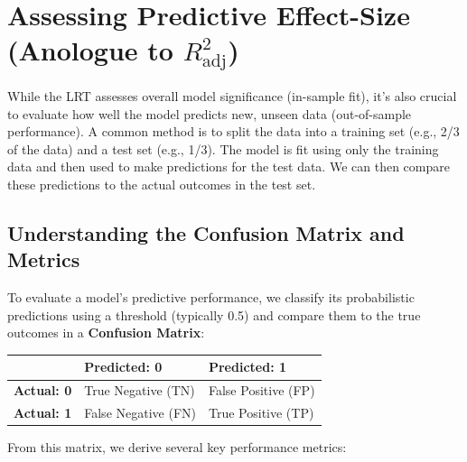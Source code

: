 \documentclass[
  letterpaper,
  DIV=11,
  numbers=noendperiod]{scrreprt}
\begin{document}
\section{\texorpdfstring{Assessing Predictive Effect-Size (Anologue to
\(R^2_\mathrm{adj}\))}{Assessing Predictive Effect-Size (Anologue to R\^{}2\_\textbackslash mathrm\{adj\})}}\label{assessing-predictive-effect-size-anologue-to-r2_mathrmadj}

While the LRT assesses overall model significance (in-sample fit), it's
also crucial to evaluate how well the model predicts new, unseen data
(out-of-sample performance). A common method is to split the data into a
training set (e.g., 2/3 of the data) and a test set (e.g., 1/3). The
model is fit using only the training data and then used to make
predictions for the test data. We can then compare these predictions to
the actual outcomes in the test set.

\subsection{Understanding the Confusion Matrix and
Metrics}\label{understanding-the-confusion-matrix-and-metrics}

To evaluate a model's predictive performance, we classify its
probabilistic predictions using a threshold (typically 0.5) and compare
them to the true outcomes in a \textbf{Confusion Matrix}:

\begin{longtable}[]{@{}lll@{}}
\toprule\noalign{}
& \textbf{Predicted: 0} & \textbf{Predicted: 1} \\
\midrule\noalign{}
\endhead
\bottomrule\noalign{}
\endlastfoot
\textbf{Actual: 0} & True Negative (TN) & False Positive (FP) \\
\textbf{Actual: 1} & False Negative (FN) & True Positive (TP) \\
\end{longtable}

From this matrix, we derive several key performance metrics:
\end{document}
